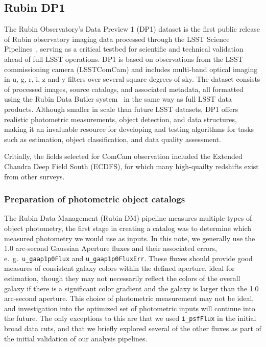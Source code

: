 \subsection{Rubin DP1}
\label{sec:data:dp1}

The Rubin Observatory’s Data Preview 1 (DP1) dataset is the first public release of Rubin observatory imaging data processed through the LSST Science Pipelines~\citep{PSTN-019}, serving as a critical testbed for scientific and technical validation ahead of full LSST operations.  DP1 is based on observations from the LSST commissioning camera (LSSTComCam) and includes multi-band optical imaging in u, g, r, i, z and y filters over several square degrees of sky.  The dataset consists of processed images, source catalogs, and associated metadata, all formatted using the Rubin Data Butler system~\citep{2022SPIE12189E..11J} in the same way as full LSST data products.  Although smaller in scale than future LSST datasets, DP1 offers realistic photometric measurements, object detection, and data structures, making it an invaluable resource for developing and testing algorithms for tasks such as \photoz estimation, object classification, and data quality assessment.

Critially, the fields selected for ComCam observation included the Extended Chandra Deep Field South (ECDFS), for which many high-quailty redshifts exist from other surveys. 


\subsubsection{Preparation of photometric object catalogs}
\label{sec:data:dp1:preparation}

The Rubin Data Management (Rubin DM) pipeline measures multiple types of object photometry, the first stage in creating a \photoz catalog was to determine which measured photometry we would use as inputs.  In this note, we generally use the 1.0 arc-second Gaussian Aperture fluxes and their associated errors, e.~g.~\texttt{u\_gaap1p0Flux} and \texttt{u\_gaap1p0FluxErr}.  These fluxes should provide good measures of consistent galaxy colors within the defined aperture, ideal for \photoz estimation, though they may not necessarily reflect the colors of the overall galaxy if there is a significant color gradient and the galaxy is larger than the 1.0 arc-second aperture.  This choice of photometric measurement may not be ideal, and investigation into the optimized set of photometric inputs will continue into the future.   The only exceptions to this are that we used \texttt{i\_psfFlux} in the initial broad data cuts, and that we briefly explored several of the other fluxes as part of the initial validation of our \photoz analysis pipelines. 


